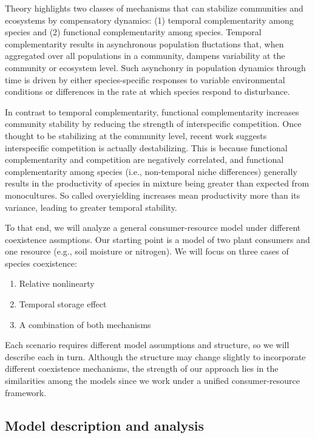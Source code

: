 \documentclass[12pt,]{article}
\begin{document}
Theory highlights two classes of mechanisms that can stabilize
communities and ecosystems by compensatory dynamics: (1) temporal
complementarity among species and (2) functional complementarity among
species. Temporal complementarity results in asynchronous population
fluctations that, when aggregated over all populations in a community,
dampens variability at the community or ecosystem level. Such asynchonry
in population dynamics through time is driven by either species-specific
responses to variable environmental conditions or differences in the
rate at which species respond to disturbance.

In contrast to temporal complementarity, functional complementarity
increases community stability by reducing the strength of interspecific
competition. Once thought to be stabilizing at the community level,
recent work suggests interspecific competition is actually
destabilizing. This is because functional complementarity and
competition are negatively correlated, and functional complementarity
among species (i.e., non-temporal niche differences) generally results
in the productivity of species in mixture being greater than expected
from monocultures. So called overyielding increases mean productivity
more than its variance, leading to greater temporal stability.

To that end, we will analyze a general consumer-resource model under
different coexistence assmptions. Our starting point is a model of two
plant consumers and one resource (e.g., soil moisture or nitrogen). We
will focus on three cases of species coexistence:

\begin{enumerate}
  \item Relative nonlinearty
  \item Temporal storage effect
  \item A combination of both mechanisms
\end{enumerate}

Each scenario requires different model assumptions and structure, so we
will describe each in turn. Although the structure may change slightly
to incorporate different coexistence mechanisms, the strength of our
approach lies in the similarities among the models since we work under a
unified consumer-resource framework.

\subsection{Model description and
analysis}\label{model-description-and-analysis}
\end{document}
